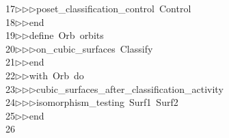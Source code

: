 \begin{tabbing}
17\>$\triangleright$\>$\triangleright$\>$\triangleright$\>poset\_classification\_control\ Control\ \\[0pt]
18\>$\triangleright$\>$\triangleright$\>end\ \\[0pt]
19\>$\triangleright$\>$\triangleright$\>define\ Orb\ orbits\ \\[0pt]
20\>$\triangleright$\>$\triangleright$\>$\triangleright$\>on\_cubic\_surfaces\ Classify\ \\[0pt]
21\>$\triangleright$\>$\triangleright$\>end\ \\[0pt]
22\>$\triangleright$\>$\triangleright$\>with\ Orb\ do\ \\[0pt]
23\>$\triangleright$\>$\triangleright$\>$\triangleright$\>cubic\_surfaces\_after\_classification\_activity\ \\[0pt]
24\>$\triangleright$\>$\triangleright$\>$\triangleright$\>isomorphism\_testing\ Surf1\ Surf2\ \\[0pt]
25\>$\triangleright$\>$\triangleright$\>end\\[0pt]
26\>\end{tabbing}
